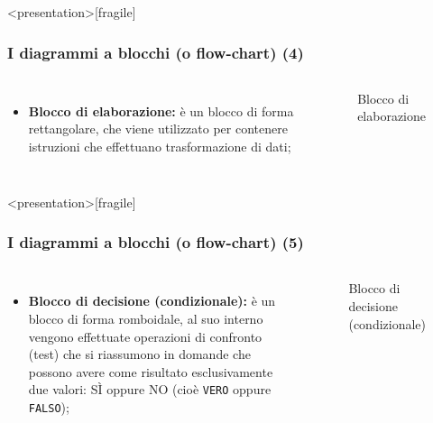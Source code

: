 \documentclass[
    notheorems,
    11pt,
    compress,
    aspectratio=169
]{beamer}
\begin{document}
\begin{frame}<presentation>[fragile]
    \frametitle{I diagrammi a blocchi (o flow-chart) (4)}
    
    \begin{columns}
            \begin{itemize}
                \item \textbf{Blocco di elaborazione:} è un blocco di forma rettangolare, che viene utilizzato per contenere istruzioni che effettuano trasformazione di dati;
            \end{itemize}

            \begin{figure}
                \centering
        
                
                \caption{Blocco di elaborazione}
                \label{fig:14}
            \end{figure}
    \end{columns}
\end{frame}

\begin{frame}<presentation>[fragile]
    \frametitle{I diagrammi a blocchi (o flow-chart) (5)}
    
    \begin{columns}
            \begin{itemize}
                \item \textbf{Blocco di decisione (condizionale):} è un blocco di forma romboidale, al suo interno vengono effettuate operazioni di confronto (te\textit{}st) che si riassumono in domande che possono avere come risultato esclusivamente due valori: SÌ oppure NO (cioè \verb|VERO| oppure \verb|FALSO|);
            \end{itemize}

            \begin{figure}
                \centering
        
                
                \caption{Blocco di decisione (condizionale)}
                \label{fig:15}
            \end{figure}
    \end{columns}
\end{frame}
\end{document}
